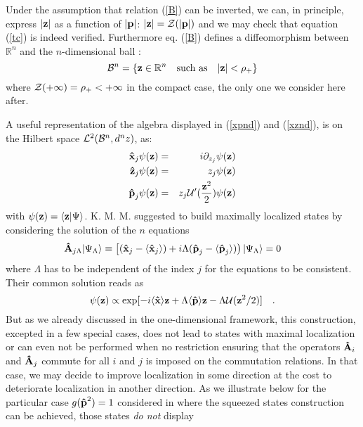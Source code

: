 \documentclass[a4paper,10pt]{article}
\newcommand{\x}{\mbox{\rm{\bf \^ x}}}
\newcommand{\p}{\mbox{\rm{\bf \^ p}}}
\newcommand{\xj}{\mbox{\rm{\bf \^ x}}_j}
\newcommand{\zj}{\mbox{\rm{\bf \^ z}}_j}
\newcommand{\pj}{\mbox{\rm{\bf \^ p}}_j}
\newcommand{\A}{\mbox{\rm{\bf \^ A}}}
\newcommand{\cU}{{\cal U}}
\newcommand{\cZ}{{\cal Z}}
\newcommand{\cL}{{\cal L}}
\newcommand{\cB}{{\cal B}}
\newcommand{\KMM}{K. M. M. }
\begin{document}
Under the assumption that relation (\ref{B}) can be inverted, we
can, in principle, express $|{\bf z}|$ as a function of $|{\bf
p}|$: $|{\bf z}| = \cZ (|{\bf p}|)$ and we may check that equation
(\ref{tc}) is indeed verified. Furthermore eq. (\ref{B}) defines a
diffeomorphism between $\mathbb{R}^n$ and the $n$-dimensional ball
:
\begin{equation}
\cB^n = \{ {\bf z} \in \mathbb{R}^n \quad \mbox{such as} \quad
|{\bf z}| < \rho_+ \}
\end{equation}
where $\cZ ( +\infty) = \rho_+ < +\infty$ in the compact case, the
only one we consider here after.

A useful representation of the algebra displayed in (\ref{xpnd})
and (\ref{xznd}), is on the Hilbert space ${\cL}^2(\cB^n,d^nz)$,
as:
\begin{eqnarray}
\x_j \psi ({\bf z}) &=& i \partial_{z_j} \psi ({\bf z}) \nonumber\\
\zj \psi ({\bf z}) &=& z_j \psi ({\bf z}) \nonumber\\
\pj \psi ({\bf z}) &=& z_j {\cU}' (\frac{{\bf z}^2}{2}) \psi ({\bf
z})
\end{eqnarray}
with $\psi ({\bf z}) = \langle {\bf z} \vert \Psi \rangle$. \KMM
suggested to build maximally localized states by considering the
solution of the $n$ equations
\begin{eqnarray}
\A_{j \Lambda}|\Psi_{\Lambda}\rangle\equiv\left[(\xj-\langle
\xj\rangle)+i\Lambda(\pj-\langle\pj\rangle)
\right)|\Psi_{\Lambda}\rangle=0\qquad \label{CSn}
\end{eqnarray}
where $\Lambda$ has to be independent of the index $j$ for the
equations to be consistent. Their common solution reads as
\begin{equation}
\psi ({\bf z}) \propto \exp[-i \langle\x\rangle {\bf z} + \Lambda
\langle\p\rangle {\bf z} - \Lambda \cU ({\bf z}^2/2)] \quad .
\end{equation}
But as we already discussed in the one-dimensional framework, this
construction, excepted in a few special cases, does not lead to
states with maximal localization or can even not be performed when
no restriction ensuring that the operators $\A_{i}$ and $\A_{j}$
commute for all $i$ and $j$ is imposed on the commutation
relations. In that case, we may decide to improve localization in
some direction at the cost to deteriorate localization in another
direction. As we illustrate below for the particular case $g(\p
^2) =1$ considered in \cite{KeMa} where the squeezed states
construction can be achieved, those states {\it do not} display
\end{document}
